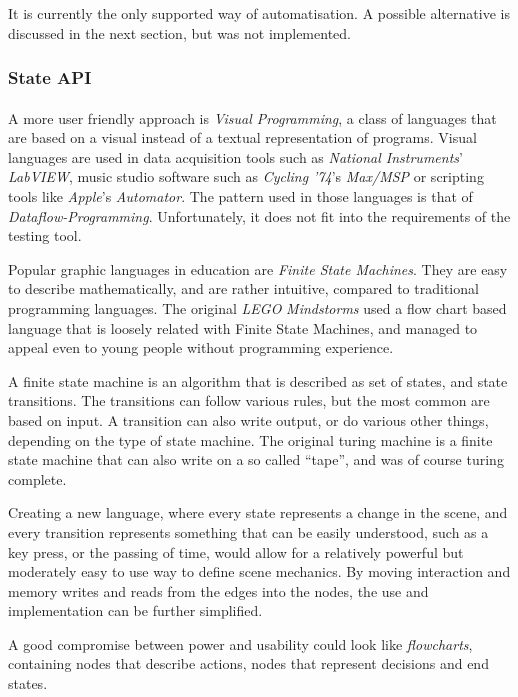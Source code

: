 It is currently the only supported way of automatisation.
A possible alternative is discussed in the next section, but was not implemented.

\subsubsection{State API}
\paragraph{}
A more user friendly approach is \textit{Visual Programming}, a class of languages that are based on a visual instead of a textual representation of programs. Visual languages are used in data acquisition tools such as \textit{National Instruments}' \textit{LabVIEW}, music studio software such as \textit{Cycling '74}'s \textit{Max/MSP} or scripting tools like \textit{Apple}'s \textit{Automator}.
The pattern used in those languages is that of \textit{Dataflow-Programming}\cite{dataflow}. Unfortunately, it does not fit into the requirements of the testing tool.

Popular graphic languages in education are \textit{Finite State Machines}\cite{fsm}. They are easy to describe mathematically, and are rather intuitive, compared to traditional programming languages.
The original \textit{LEGO} \textit{Mindstorms} used a flow chart based language that is loosely related with Finite State Machines, and managed to appeal even to young people without programming experience.

A finite state machine is an algorithm that is described as set of states, and state transitions. The transitions can follow various rules, but the most common are based on input. A transition can also write output, or do various other things, depending on the type of state machine.
The original turing machine is a finite state machine that can also write on a so called ``tape'', and was of course turing complete.

Creating a new language, where every state represents a change in the scene, and every transition represents something that can be easily understood, such as a key press, or the passing of time, would allow for a relatively powerful but moderately easy to use way to define scene mechanics.
By moving interaction and memory writes and reads from the edges into the nodes, the use and implementation can be further simplified.

A good compromise between power and usability could look like \textit{flowcharts}, containing nodes that describe actions, nodes that represent decisions and end states.

